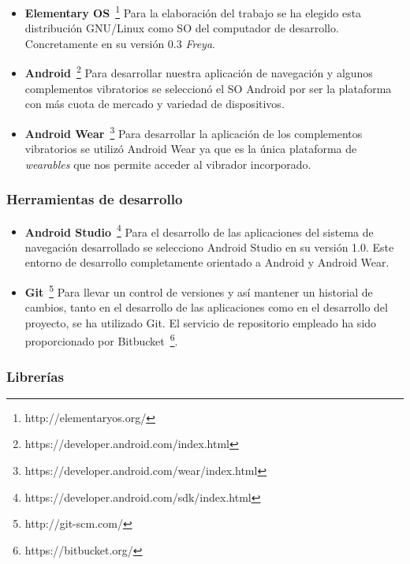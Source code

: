 \begin{itemize}
  \item \textbf{Elementary OS}~\footnote{http://elementaryos.org/} Para la elaboración del trabajo
    se ha elegido esta distribución GNU/Linux como \acs{SO} del computador de
    desarrollo. Concretamente en su versión 0.3 \emph{Freya}.

  \item \textbf{Android}~\footnote{https://developer.android.com/index.html} Para desarrollar
    nuestra aplicación de navegación y algunos complementos vibratorios se seleccionó el \acs{SO}
    Android por ser la plataforma con más cuota de mercado y variedad de dispositivos.

  \item \textbf{Android Wear}~\footnote{https://developer.android.com/wear/index.html} Para
    desarrollar la aplicación de los complementos vibratorios se utilizó Android Wear ya que es la
    única plataforma de \emph{wearables} que nos permite acceder al vibrador incorporado.

\end{itemize}

\subsubsection{Herramientas de desarrollo}

\begin{itemize}
  \item \textbf{Android Studio}~\footnote{https://developer.android.com/sdk/index.html} Para el
    desarrollo de las aplicaciones del sistema de navegación desarrollado se selecciono Android
    Studio en su versión 1.0. Este entorno de desarrollo completamente orientado a Android y Android
    Wear.

  \item \textbf{Git}~\footnote{http://git-scm.com/} Para llevar un control de versiones y así
    mantener un historial de cambios, tanto en el desarrollo de las aplicaciones como en el
    desarrollo del proyecto, se ha utilizado Git. El servicio de repositorio empleado ha sido
    proporcionado por Bitbucket~\footnote{https://bitbucket.org/}.

\end{itemize}

\subsubsection{Librerías}

